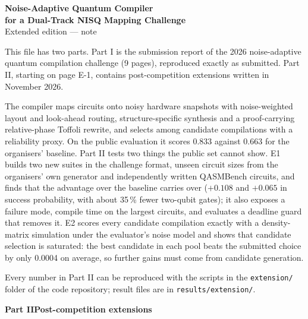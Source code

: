 
\graphicspath{{../../figures/extension/}}

\thispagestyle{empty}
\begin{center}
{\Large\bfseries Noise-Adaptive Quantum Compiler\\[0.2em] for a Dual-Track NISQ Mapping Challenge}\\[0.7em]
{\large Extended edition --- note}
\end{center}
\vspace{0.8em}

This file has two parts. Part I is the submission report of the 2026 noise-adaptive quantum compilation challenge (9 pages), reproduced exactly as submitted. Part II, starting on page E-1, contains post-competition extensions written in November 2026.

The compiler maps circuits onto noisy hardware snapshots with noise-weighted layout and look-ahead routing, structure-specific synthesis and a proof-carrying relative-phase Toffoli rewrite, and selects among candidate compilations with a reliability proxy. On the public evaluation it scores 0.833 against 0.663 for the organisers' baseline. Part II tests two things the public set cannot show. E1 builds two new suites in the challenge format, unseen circuit sizes from the organisers' own generator and independently written QASMBench circuits, and finds that the advantage over the baseline carries over ($+0.108$ and $+0.065$ in success probability, with about 35\,\% fewer two-qubit gates); it also exposes a failure mode, compile time on the largest circuits, and evaluates a deadline guard that removes it. E2 scores every candidate compilation exactly with a density-matrix simulation under the evaluator's noise model and shows that candidate selection is saturated: the best candidate in each pool beats the submitted choice by only 0.0004 on average, so further gains must come from candidate generation.

Every number in Part II can be reproduced with the scripts in the \texttt{extension/} folder of the code repository; result files are in \texttt{results/extension/}.

\clearpage
{}

\setcounter{page}{1}
\begin{center}{\Large\bfseries Part II\quad Post-competition extensions}\end{center}


